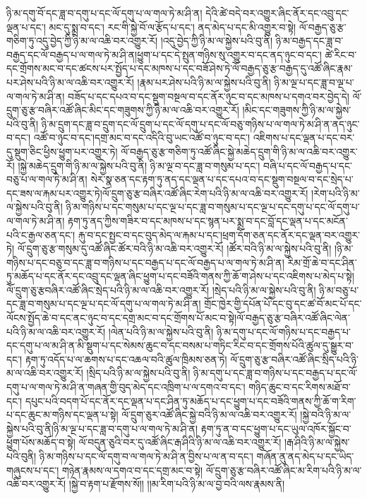 ཉི་མ་དགུ་བོ་དང་ཟླ་བ་དགུ་པ་དང་ལོ་དགུ་པ་ལ་གལ་ཏེ་མ་ཤི་ན། དེའི་ཚེ་བདེ་བར་འགྱུར་ཞིང་ནོར་དང་འབྲུ་དང་ལྡན་པ་དང་། མང་དུ་སྨྲ་བ་དང་། རང་གི་སྐྱེ་བོ་ལ་རྩོད་པ་དང་། ནད་མེད་པ་དང་མི་འགྱུར་བ་སྟེ། ལོ་བརྒྱད་ཅུ་རྩ་གཅིག་ཏུ་འདུ་བྱེད་ཀྱི་ཉི་མ་ལ་འཆི་བར་འགྱུར་རོ། །འདུ་བྱེད་ཀྱི་ཉི་མ་ལ་སྐྱེས་པའི་བུ་ནི། ཉི་མ་བརྒྱད་དང་ཟླ་བ་བརྒྱད་དང་ལོ་བརྒྱད་པ་ལ་གལ་ཏེ་མ་ཤི་ན།ཕྱུག་པ་དང་དེ་སྤུན་གཉིས་སུ་འགྱུར་བ་དང་ནད་ཉུང་བ་དང་། ཚེ་རིང་བ་དང་གྲོགས་མང་བ་དང་ཚངས་པར་སྤྱོད་པ་དང་མཁས་པ་དང་བཟོ་ཤེས་ཏེ་ལོ་བརྒྱད་ཅུ་རྩ་བརྒྱད་དུ་འཚོ་ཞིང་རྣམ་པར་ཤེས་པའི་ཉི་མ་ལ་འཆི་བར་འགྱུར་རོ། །རྣམ་པར་ཤེས་པའི་ཉི་མ་ལ་སྐྱེས་པའི་བུ་ནི། ཉི་མ་ལྔ་པ་དང་ཟླ་བ་ལྔ་པ་ལ་གལ་ཏེ་མ་ཤི་ན། བཟོད་པ་དང་དཔའ་བ་དང་སྡུག་བསྔལ་བ་དང་ནོར་ཉུང་བ་དང་མཁས་པ་དགའ་བར་བྱེད་དེ། ལོ་དྲུག་ཅུ་རྩ་བཞིར་འཚོ་ཞིང་མིང་དང་གཟུགས་ཀྱི་ཉི་མ་ལ་འཆི་བར་འགྱུར་རོ། །མིང་དང་གཟུགས་ཀྱི་ཉི་མ་ལ་སྐྱེས་པའི་བུ་ནི། ཉི་མ་དྲུག་དང་ཟླ་བ་དྲུག་དང་ལོ་དྲུག་པ་དང་ལོ་དགུ་པ་དང་ལོ་བཅུ་གཉིས་པ་ལ་གལ་ཏེ་མ་ཤི་ན་ནད་ཉུང་བ་དང་། འཚོ་བ་ཉུང་བ་དང་།དགྲ་མང་བ་དང་འདིའི་བུ་ཡང་འཚོ་བ་ཉུང་བ་དང་། འཇིགས་པ་དང་ལྡན་པ་དང་བར་དུ་སྡུག་ཅིང་ཕྱིས་ཕྱུག་པར་འགྱུར་ཏེ། ལོ་བརྒྱད་ཅུ་རྩ་གཅིག་ཏུ་འཚོ་ཞིང་སྐྱེ་མཆེད་དྲུག་གི་ཉི་མ་ལ་འཆི་བར་འགྱུར་རོ། །སྐྱེ་མཆེད་དྲུག་གི་ཉི་མ་ལ་སྐྱེས་པའི་བུ་ནི། ཉི་མ་ལྔ་བ་དང་ཟླ་བ་གསུམ་པ་དང་། བཞི་པ་དང་ལོ་བརྒྱད་པ་དང་བཅུ་པ་ལ་གལ་ཏེ་མ་ཤི་ན། སེར་སྣ་ཅན་དང་རྟག་ཏུ་ནད་དང་ལྡན་པ་དང་དཔའ་བ་དང་སྡུག་བསྔལ་བ་དང་སྲེད་པ་དང་ཟས་ལ་རྐམ་པར་འགྱུར་ཏེ།ལོ་དྲུག་ཅུ་རྩ་བཞིར་འཚོ་ཞིང་རེག་པའི་ཉི་མ་ལ་འཆི་བར་འགྱུར་རོ། །རེག་པའི་ཉི་མ་ལ་སྐྱེས་པའི་བུ་ནི། ཉི་མ་གཉིས་པ་དང་གསུམ་པ་དང་ལྔ་པ་དང་ཟླ་བ་གསུམ་པ་དང་ལྔ་པ་དང་དགུ་པ་དང་ལོ་དགུ་པ་ལ་གལ་ཏེ་མ་ཤི་ན། རྟག་ཏུ་ནད་ཀྱིས་གཟིར་བ་དང་མཁས་པ་དང་སྙན་པར་སྨྲ་བ་དང་བློ་དང་ལྡན་པ་དང་མངོན་པའི་ང་རྒྱལ་ཅན་དང་། རྐུ་བ་དང་སྤྱང་བ་དང་བུད་མེད་ལ་རྐམ་པ་དང་།ཕྲག་དོག་ཅན་དང་ནོར་དང་ལྡན་བར་འགྱུར་ཏེ། ལོ་དྲུག་ཅུ་རྩ་གསུམ་དུ་འཚོ་ཞིང་ཚོར་བའི་ཉི་མ་འཆི་བར་འགྱུར་རོ། །ཚོར་བའི་ཉི་མ་ལ་སྐྱེས་པའི་བུ་ནི། །ཉི་མ་གཉིས་པ་དང་བཅུ་བ་དང་ཟླ་བ་གཉིས་པ་དང་བརྒྱད་པ་དང་ལོ་བརྒྱད་པ་ལ་གལ་ཏེ་མ་ཤི་ན། རིམ་གྲོ་ཆེ་བ་དང་ཤིན་ཏུ་མཆོད་པ་དང་ནོར་དང་འབྲུ་དང་ལྡན་ཞིང་ཕྱུག་པ་དང་བཟོའི་གནས་ཀྱི་ཆོ་ག་ཤེས་པ་དང་འཇིགས་པ་མེད་པ་སྟེ།ལོ་དྲུག་ཅུ་རྩབཞིར་འཚོ་ཞིང་སྲེད་པའི་ཉི་མ་ལ་འཆི་བར་འགྱུར་རོ། །སྲེད་པའི་ཉི་མ་ལ་སྐྱེས་པའི་བུ་ནི། ཉི་མ་བཅུ་པ་དང་ཟླ་བ་གསུམ་པ་དང་ལྔ་པ་དང་ལོ་དགུ་པ་ལ་གལ་ཏེ་མ་ཤི་ན། གྲོང་ཁྱེར་གྱི་དཔོན་པོ་དང་བུ་དང་ཚ་བོ་མང་པོ་དང་ལོངས་སྤྱོད་ཆེ་བ་དང་ནང་ཉུང་བ་དང་དགྲ་མང་བ་དང་གྲོགས་པོ་མང་བ་སྟེ།ལོ་བརྒྱད་ཅུ་རྩ་བཞིར་འཚོ་ཞིང་ལེན་པའི་ཉི་མ་ལ་འཆི་བར་འགྱུར་རོ། །ལེན་པའི་ཉི་མ་ལ་སྐྱེས་པའི་བུ་ནི། ཉི་མ་དགུ་པ་དང་ལོ་གཉིས་པ་དང་བརྒྱད་པ་དང་དགུ་པ་ལ་མ་ཤི་ན་མི་སྡུག་པ་དང་སེམས་ཆུང་བ་དང་བསམ་པ་གཏིང་རིང་བ་དང་གྲོགས་པོའི་ཚུལ་དུ་སྒྱུར་བ་དང་། རྟག་ཏུ་འདོད་པ་ལ་ཆགས་པ་དང་འཆལ་བའི་ཚུལ་ཁྲིམས་ཅན་ཏེ། ལོ་དྲུག་ཅུ་རྩ་བཞིར་འཚོ་ཞིང་སྲིད་པའི་ཉི་མ་ལ་འཆི་བར་འགྱུར་རོ། །སྲིད་པའི་ཉི་མ་ལ་སྐྱེས་པའི་བུ་ནི། ཉི་མ་དགུ་པ་དང་ཟླ་བ་གཉིས་པ་དང་བརྒྱད་པ་དང་ལོ་དགུ་པ་ལ་གལ་ཏེ་མ་ཤི་ན་གཞན་གྱི་བུད་མེད་དང་འཁྲིག་པ་ལ་དགའ་བ་དང་། གཉིད་ཆུང་བ་དང་རིགས་མཐོ་བ་དང་། དཔུང་པའི་བདག་པོ་དང་ནོར་དང་ལྡན་པ་དང་ཤིན་ཏུ་མཆོད་པ་དང་ཕྱུག་པ་དང་བཟོའི་གནས་ཀྱི་ཆོ་ག་རིག་པ་དང་ཆུང་མ་གཉིས་དང་ལྡན་པ་སྟེ། ལོ་དྲུག་ཅུར་འཚོ་ཞིང་སྐྱེ་བའི་ཉི་མ་ལ་འཆི་བར་འགྱུར་རོ། །སྐྱེ་བའི་ཉི་མ་ལ་སྐྱེས་པའི་བུ་ནི།ཉི་མ་ལྔ་པ་དང་ཟླ་བ་དགུ་པ་ལ་གལ་ཏེ་མ་ཤི་ན། རྟག་ཏུ་ན་བ་དང་ཕྱུག་པ་དང་ཡུལ་འཁོར་སྐྱོང་བ་ཕྱུག་པོས་མཆོད་བ་སྟེ། ལོ་བདུན་ཅུའི་བར་དུ་འཚོ་ཞིང་རྒ་ཤིའི་ཉི་མ་ལ་འཆི་བར་འགྱུར་རོ། །རྒ་ཤིའི་ཉི་མ་ལ་སྐྱེས་པའི་བུནི། ཉི་མ་གཉིས་པ་དང་ལོ་དགུ་བ་ལ་གལ་ཏེ་མ་ཤི་ན་བྱིས་པ་ལ་ན་བ་དང་། གཞོན་ནུ་ནད་མེད་པ་དང་ཡིད་གཞུངས་པ་དང་། གཉེན་རྣམས་ལ་དགའ་བ་དང་དགྲ་མང་བ་སྟེ། ལོ་དྲུག་ཅུ་རྩ་བཞིར་འཚོ་ཞིང་མ་རིག་པའི་ཉི་མ་ལ་འཆི་བར་འགྱུར་རོ། །སྐྱེ་བ་རྟག་པ་རྫོགས་སོ།། །།མ་རིག་པའི་ཉི་མ་ལ་བྱ་བའི་ལས་རྣམས་ནི། 